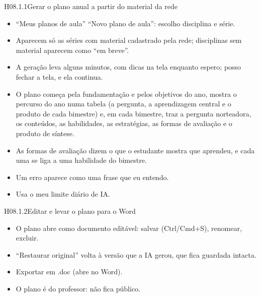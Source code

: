 \begin{historia}{H08.1.1}{Gerar o plano anual a partir do material da rede}{\pronto}
\aceite
\begin{itemize}
  \item \enquote{Meus planos de aula} \seta{} \enquote{Novo plano de aula}:
    escolho disciplina e série.
  \item Aparecem só as séries com material cadastrado pela rede; disciplinas
    sem material aparecem como \enquote{em breve}.
  \item A geração leva alguns minutos, com dicas na tela enquanto espero;
    posso fechar a tela, e ela continua.
  \item O plano começa pela fundamentação e pelos objetivos do ano, mostra o
    percurso do ano numa tabela (a pergunta, a aprendizagem central e o produto de
    cada bimestre) e, em cada bimestre, traz a pergunta norteadora, os conteúdos, as
    habilidades, as estratégias, as formas de avaliação e o produto de síntese.
  \item As formas de avaliação dizem o que o estudante mostra que aprendeu, e
    cada uma se liga a uma habilidade do bimestre.
  \item Um erro aparece como uma frase que eu entendo.
  \item Usa o meu limite diário de IA.
\end{itemize}
\end{historia}

\begin{historia}{H08.1.2}{Editar e levar o plano para o Word}{\pronto}
\aceite
\begin{itemize}
  \item O plano abre como documento editável: salvar (Ctrl/Cmd+S), renomear,
    excluir.
  \item \enquote{Restaurar original} volta à versão que a IA gerou, que fica
    guardada intacta.
  \item Exportar em .doc (abre no Word).
  \item O plano é do professor: não fica público.
\end{itemize}
\end{historia}


